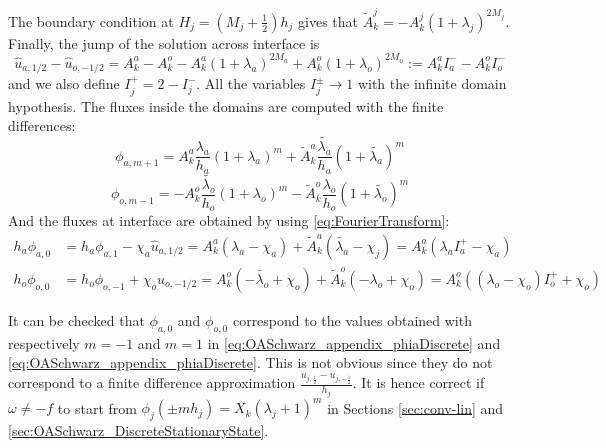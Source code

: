 The boundary condition at $H_j = (M_j + \frac{1}{2}) h_j$ gives that
$\widetilde{A}_k^j = - A_k^j \left(1+\lambda_j\right)^{2 M_j}$.
Finally, the jump of the solution across interface is
\begin{equation*}
\widehat{u}_{a, 1/2} - 
\widehat{u}_{o, -1/2} = A_k^a - A_k^o
- A_k^a\left(1+\lambda_a\right)^{2M_a}
+ A_k^o\left(1+\lambda_o\right)^{2M_o}
	:= A_k^a I_a^{-} - A_k^o I_o^{-}
\end{equation*}
and we also define $I_j^{+} = 2-I_j^{-}$. All the variables
$I_j^{\pm}\rightarrow 1$ with the infinite domain hypothesis.
The fluxes inside the domains are computed
with the finite differences:
\begin{equation}
	\label{eq:OASchwarz_appendix_phiaDiscrete}
\phi_{a,m+1} = A_k^a \frac{\lambda_a}{h_a}
	(1+\lambda_a)^m + \widetilde{A}_k^a \frac{\widetilde{\lambda_a}}{h_a}
	(1+\widetilde{\lambda_a})^m
\end{equation}
\begin{equation}
	\label{eq:OASchwarz_appendix_phioDiscrete}
\phi_{o,m-1} = -A_k^o \frac{\widetilde{\lambda_o}}{h_o}
	(1+\lambda_o)^m - \widetilde{A}_k^o \frac{{\lambda_o}}{h_o}
	(1+\widetilde{\lambda_o})^m
\end{equation}
And the fluxes at interface are obtained 
by using \eqref{eq:FourierTransform}:
\begin{equation*}
\begin{aligned}
h_a\phi_{a,0}&= h_a\phi_{a,1} - \chi_a \widehat{u}_{a, 1/2}
= A_k^a \left(\lambda_a - \chi_a\right) +
	\widetilde{A}_k^a\left(\widetilde{\lambda_a} - \chi_j\right)
	= A_k^a ({\lambda_a} I_a^{+} - \chi_a)
\\
h_o\phi_{o,0}&= h_o\phi_{o,-1} + \chi_o \widehat{u}_{o, -1/2}
	= A_k^o \left(-\widetilde{\lambda_o} + \chi_o\right) +
	\widetilde{A}_k^o\left(-{\lambda_o} + \chi_o\right)
	=A_k^o(({\lambda_o}-\chi_o)I_o^{+} + \chi_o)
\end{aligned}
\end{equation*}
\begin{remark}
It can be checked that $\phi_{a,0}$ and $\phi_{o,0}$
correspond to the values obtained with respectively
$m=-1$ and $m=1$ in
\eqref{eq:OASchwarz_appendix_phiaDiscrete} and
\eqref{eq:OASchwarz_appendix_phiaDiscrete}. This
is not obvious since they do not correspond to a finite
difference approximation $\frac{u_{j, \frac{1}{2}} -
u_{j, -\frac{1}{2}}}{h_j}$.
It is hence correct if $\omega \neq -f$ to start from
$\phi_j(\pm m h_j)= X_k(\lambda_j+1)^m$ in Sections
	\ref{sec:conv-lin} and \ref{sec:OASchwarz_DiscreteStationaryState}.
\end{remark}
